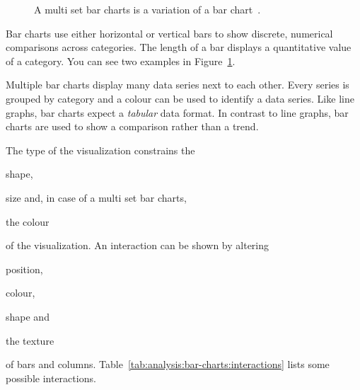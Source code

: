 \begin{figure}
  \begin{center}
    \qquad
    \caption{A multi set bar charts is a variation of a bar chart~\parencite{VisualizationCatalogue2017}.}
    \label{fig:analysis:bar-charts}
  \end{center}
\end{figure}

Bar charts use either horizontal or vertical bars to show discrete, numerical comparisons across categories.
The length of a bar displays a quantitative value of a category.
You can see two examples in Figure~\ref{fig:analysis:bar-charts}.

Multiple bar charts display many data series next to each other.
Every series is grouped by category and a colour can be used to identify a data series.
Like line graphs, bar charts expect a \emph{tabular} data format.
In contrast to line graphs, bar charts are used to show a comparison rather than a trend.

The type of the visualization constrains the
\begin{enumerate*}[label=(\arabic*)]
    \item shape,
    \item size and, in case of a multi set bar charts,
    \item the colour
\end{enumerate*}
of the visualization.
An interaction can be shown by altering
\begin{enumerate*}[label=(\arabic*)]
    \item position,
    \item colour,
    \item shape and
    \item the texture
\end{enumerate*}
of bars and columns.
Table~\ref{tab:analysis:bar-charts:interactions} lists some possible interactions.


